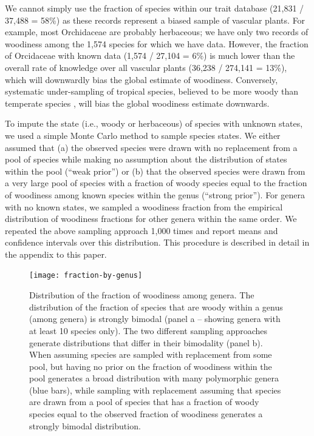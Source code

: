 \documentclass[12pt]{article}
\begin{document}
We cannot simply use the fraction of species within our trait database
(21,831 / 37,488 = 58\%) as these records represent a biased sample of
vascular plants.
For example, most Orchidaceae are probably herbaceous; we have only
two records of woodiness among the 1,574 species for which we have
data.
However, the fraction of Orcidaceae with known data (1,574 / 27,104 =
6\%)
is much lower than the overall rate of knowledge over all vascular
plants (36,238 / 274,141 = 13\%), which will downwardly bias the
global estimate of woodiness.
%
Conversely, systematic under-sampling of tropical species, believed to
be more woody than temperate species \citep{Molesheihgt}, will bias
the global woodiness estimate downwards.

To impute the state (i.e., woody or herbaceous) of species with
unknown states, we used a simple Monte Carlo method to sample species
states.  We either assumed that (a) the observed species were drawn
with no replacement from a pool of species while making no assumption
about the distribution of states within the pool (``weak prior'') or
(b) that the observed species were drawn from a very large pool of
species with a fraction of woody species equal to the fraction of
woodiness among known species within the genus (``strong prior'').
%
For genera with no known states, we sampled a woodiness fraction from
the empirical distribution of woodiness fractions for other genera
within the same order.
%
We repeated the above sampling approach 1,000 times and report means
and confidence intervals over this distribution.
%
This procedure is described in detail in the appendix to this paper.

\begin{figure}[p]
  \centering
  \texttt{[image: fraction-by-genus]}
  \caption{Distribution of the fraction of woodiness among genera.
    The distribution of the fraction of species that are woody within
    a genus (among genera) is strongly bimodal (panel a -- showing
    genera with at least 10 species only).
    The two different sampling approaches generate distributions that
    differ in their bimodality (panel b).  When assuming species are
    sampled with replacement from some pool, but having no prior on
    the fraction of woodiness within the pool generates a broad
    distribution with many polymorphic genera (blue bars), while
    sampling with replacement assuming that species are drawn from a
    pool of species that has a fraction of woody species equal to the
    observed fraction of woodiness generates a strongly bimodal
    distribution.}
  \label{fig:distribution-genera}
\end{figure}
\end{document}

